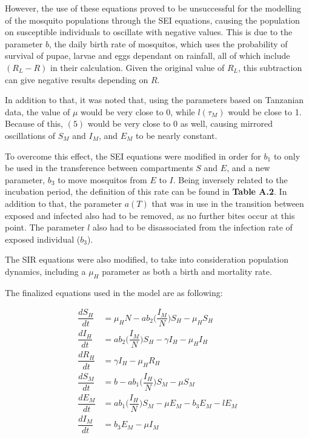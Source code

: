 \documentclass[a4paper,fleqn]{cas-dc}
\begin{document}
However, the use of these equations proved to be unsuccessful for the modelling of the mosquito populations through the SEI equations, 
causing the population on susceptible individuals to oscillate with negative values. This is due to the parameter $b$, the daily birth rate of mosquitos, 
which uses the probability of survival of pupae, larvae and eggs dependant on rainfall, all of which include $(R_L - R)$ in their calculation. Given the original 
value of $R_L$, this subtraction can give negative results depending on $R$. 

In addition to that, it was noted that, using the parameters based on Tanzanian 
data,  the value of $\mu$ would be very close to 0, while $l(\tau_M)$ would be close to 1. Because of this, $(5)$ would be very close to 0 as 
well, causing mirrored oscillations of $S_M$ and $I_M$, and $E_M$ to be nearly constant.

To overcome this effect, the SEI equations were modified in order for $b_1$ to only be used in the transference between compartments $S$ and $E$, 
and a new parameter, $b_3$ to move mosquitos from $E$ to $I$. Being inversely related to the incubation period, the definition of this rate can be found in \textbf{Table A.2}. 
In addition to that, the parameter $a(T)$ that was in use in the transition between exposed and infected also had to be removed, as no further bites occur at this point. 
The parameter $l$ also had to be disassociated from the infection rate of exposed individual ($b_3$).

The SIR equations were also modified, to take into consideration population dynamics, including a $\mu_H$ parameter as both a birth and mortality rate.

The finalized equations used in the model are as following:  

\begin{align}
\dfrac{dS_H}{dt} & = \mu_HN-ab_2\bigg(\dfrac{I_M}{N}\bigg)S_H - \mu_HS_H \label{eq1}\\ %
\dfrac{dI_H}{dt} & = ab_2\bigg(\dfrac{I_M}{N}\bigg)S_H-\gamma I_H - \mu_HI_H \label{eq2}\\ %
\dfrac{dR_H}{dt} & = \gamma I_H - \mu_HR_H \label{eq3}\\ %
\dfrac{dS_M}{dt} & = b - ab_1\bigg(\dfrac{I_H}{N}\bigg)S_M - \mu S_M \label{eq4}\\ %
\dfrac{dE_M}{dt} & = ab_1\bigg(\dfrac{I_H}{N}\bigg)S_M - \mu E_M - b_3E_M -lE_M \label{eq5} \\%
\dfrac{dI_M}{dt} & = b_3E_M -\mu I_M  \label{eq6} %
\end{align}
\end{document}

